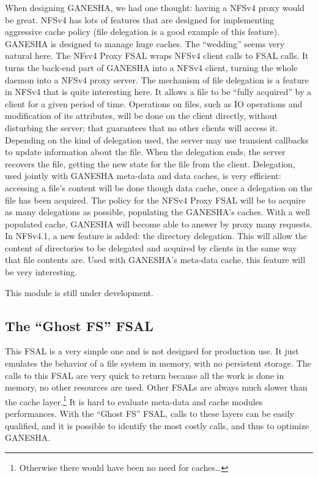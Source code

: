 \documentclass[final]{ols}
\begin{document}
When designing GANESHA, we had one thought: having a NFSv4 proxy would
be great. NFSv4 has lots of features that are designed for
implementing aggressive cache policy (file delegation is a good
example of this feature). GANESHA is designed to manage huge caches.
The ``wedding'' seems very natural here.  The NFsv4 Proxy FSAL wraps
NFSv4 client calls to FSAL calls. It turns the back-end part of
GANESHA into a NFSv4 client, turning the whole daemon into a NFSv4
proxy server.  The mechanism of file delegation is a feature in NFSv4
that is quite interesting here. It allows a file to be ``fully acquired''
by a client for a given period of time. Operations on files, such as
IO operations and modification of its attributes, will be done on the
client directly, without disturbing the server; that guarantees that no
other clients will access it. Depending on the kind of delegation
used, the server may use transient callbacks to update information
about the file. When the delegation ends, the server recovers the file,
getting the new state for the file from the client.  Delegation, used
jointly with GANESHA meta-data and data caches, is very efficient:
accessing a file's content will be done though data cache, once a
delegation on the file has been acquired. The policy for the
NFSv4 Proxy FSAL will be to acquire as many delegations as possible,
populating the GANESHA's caches. With a well populated cache, GANESHA
will become able to answer by proxy many requests. In NFSv4.1, a
new feature is added: the directory delegation. This will allow the
content of directories to be delegated and acquired by clients in the
same way that file contents are. Used with GANESHA's meta-data cache, this
feature will be very interesting.

This module is still under development.

\subsection{The ``Ghost FS'' FSAL}

This FSAL is a very simple one and is not designed for production use.
It just emulates the behavior of a file system in memory, with no
persistent storage. The calls to this FSAL are very quick to return
because all the work is done in memory, no other resources are used.
Other FSALs are always much slower than the cache
layer.\footnote{Otherwise there would have been no need for
caches\ldots} It 
is hard to evaluate meta-data and cache modules performances. With the
``Ghost FS'' FSAL, calls to these layers can be easily qualified, and it is
possible to identify the most costly calls, and thus to optimize GANESHA.
\end{document}
